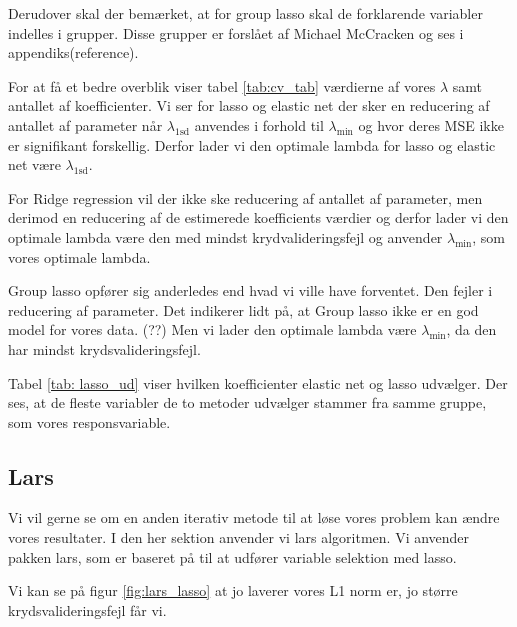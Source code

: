 Derudover skal der bemærket, at for group lasso skal de forklarende variabler indelles i  grupper. 
Disse grupper er forslået af Michael McCracken og ses i appendiks(reference).


For at få et bedre overblik viser tabel  \ref{tab:cv_tab} værdierne af vores $\lambda$ samt antallet af koefficienter. 
Vi ser for lasso og elastic net der sker en reducering af antallet af parameter når $\lambda_{1\text{sd}}$ anvendes i forhold til $\lambda_{\min}$ og hvor deres MSE ikke er signifikant forskellig.  
Derfor lader vi den optimale lambda for lasso og elastic net være $\lambda_{1\text{sd}}$.

For Ridge regression vil der ikke ske reducering af antallet af parameter, men derimod en reducering af de estimerede koefficients værdier og derfor lader vi den optimale lambda være den med mindst krydvalideringsfejl og anvender $\lambda_{\min}$, som vores optimale lambda. 

Group lasso opfører sig anderledes end hvad vi ville have forventet. 
Den fejler i reducering af parameter. 
Det indikerer lidt på, at Group lasso ikke er en god model for vores data. (??)
Men vi  lader den optimale lambda være $\lambda_{\min}$, da den har mindst krydsvalideringsfejl. 



Tabel \ref{tab: lasso_ud} viser hvilken koefficienter elastic net og lasso udvælger. 
Der ses, at de fleste variabler de to metoder udvælger stammer fra samme gruppe, som vores responsvariable.  



\subsection{Lars}
Vi vil gerne se om en anden iterativ metode til at løse vores problem kan ændre vores resultater. 
I den her sektion anvender vi lars algoritmen. 
Vi anvender pakken lars, som er baseret på  \citep{lars} til at udfører variable selektion med lasso.

Vi kan se på figur \ref{fig:lars_lasso} at jo laverer vores L1 norm er, jo større krydsvalideringsfejl får vi.  



